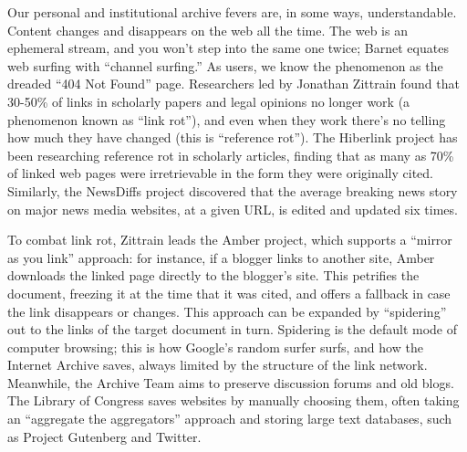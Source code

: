 Our personal and institutional archive fevers are, in some ways, understandable. Content changes and disappears on the web all the time. The web is an ephemeral stream, and you won't step into the same one twice; Barnet equates web surfing with ``channel surfing.''\autocite[217]{barnet_pack-rat_2001} As users, we know the phenomenon as the dreaded ``404 Not Found'' page. Researchers led by Jonathan Zittrain found that 30-50\% of links in scholarly papers and legal opinions no longer work (a phenomenon known as ``link rot''), and even when they work there's no telling how much they have changed (this is ``reference rot'').\autocite{zittrain_perma:_2013} The Hiberlink project has been researching reference rot in scholarly articles, finding that as many as 70\% of linked web pages were irretrievable in the form they were originally cited.\autocite{http://www.lanl.gov/discover/news-release-archive/2015/January/01.26-scholarly-articles-affected-by-reference-rot.php} Similarly, the NewsDiffs project discovered that the average breaking news story on major news media websites, at a given URL, is edited and updated six times.\autocite{NewsDiffs; check this figure}

To combat link rot, Zittrain leads the Amber project, which supports a ``mirror as you link'' approach: for instance, if a blogger links to another site, Amber downloads the linked page directly to the blogger's site.\autocite{https://cyber.law.harvard.edu/node/92313} This petrifies the document, freezing it at the time that it was cited, and offers a fallback in case the link disappears or changes. This approach can be expanded by ``spidering'' out to the links of the target document in turn. Spidering is the default mode of computer browsing; this is how Google's random surfer surfs, and how the Internet Archive saves, always limited by the structure of the link network. Meanwhile, the Archive Team aims to preserve discussion forums and old blogs. The Library of Congress saves websites by manually choosing them, often taking an ``aggregate the aggregators'' approach and storing large text databases, such as Project Gutenberg and Twitter.


